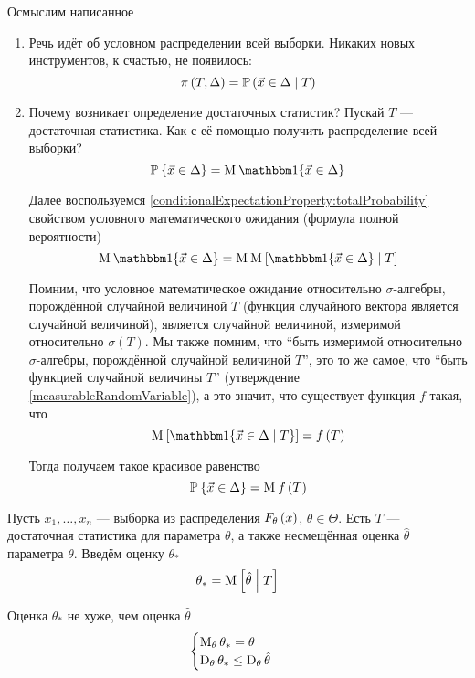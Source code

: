 Осмыслим написанное
\begin{enumerate}
  \item Речь идёт об условном распределении всей выборки.
      Никаких новых инструментов, к счастью, не появилось:
      $$\pi\left( T, \Delta \right)
      = \mathbb{P}\left( \vec{x} \in \Delta \;\middle|\; T \right)$$
  \item Почему возникает определение достаточных статистик?
      Пускай $T$ --- достаточная статистика.
      Как с её помощью получить распределение всей выборки?
      $$\Probability{\vec{x} \in \Delta}
      = \mean{\Indicator{\vec{x} \in \Delta}}$$

      Далее воспользуемся
      \ref{conditionalExpectationProperty:totalProbability}
      свойством условного математического ожидания
      (формула полной вероятности)
      $$\mean{\Indicator{\vec{x} \in \Delta}}
      = \mean{\Mean{\Indicator{\vec{x} \in \Delta} \mcond T}}$$

      Помним, что условное математическое ожидание
      относительно $\sigma$-алгебры, порождённой случайной величиной $T$
      (функция случайного вектора является случайной величиной),
      является случайной величиной, измеримой
      относительно $\sigma\left( T \right)$.
      Мы также помним, что ``быть измеримой относительно $\sigma$-алгебры,
      порождённой случайной величиной $T$'', это то же самое, что
      ``быть функцией случайной величины $T$''
      (утверждение \ref{measurableRandomVariable}), а это значит,
      что существует функция $f$ такая, что
      $$\Mean{\Indicator{\vec{x} \in \Delta \mcond T}} = f\left( T \right)$$

      Тогда получаем такое красивое равенство
      $$\mathbb{P}_{{}}\left\{ \vec{x} \in \Delta \right\} = \operatorname{M}_{} f\left( T \right)$$
\end{enumerate}

\begin{theorem}
  Пусть $x_1, \dots, x_n$ --- выборка из распределения $F_{\theta}\left(x\right)$,
  $\theta \in \Theta$.
  Есть $T$ --- достаточная статистика для параметра $\theta$,
  а также несмещённая оценка $\hat{\theta}$ параметра $\theta$.
  Введём оценку $\theta_*$
  $$\theta_* = \operatorname{M}_{} \left[ \hat{\theta} \;\middle|\; T \right]$$

  Оценка $\theta_*$ не хуже, чем оценка $\hat{\theta}$
  $$\begin{cases}
      \operatorname{M}_{\theta} \theta_* = \theta \\
      \operatorname{D}_{\theta} \theta_* \le \operatorname{D}_{\theta} \hat{\theta}
  \end{cases}$$
\end{theorem}

